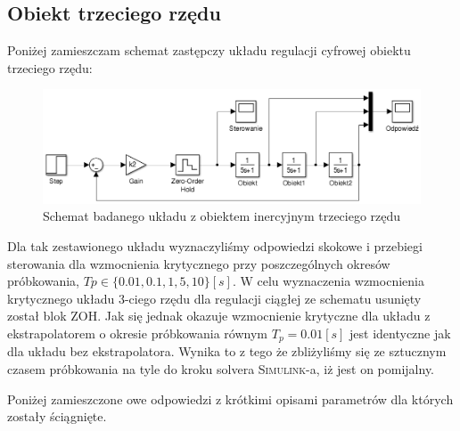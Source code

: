\documentclass[12pt]{article}
\begin{document}
\newpage

\subsection{Obiekt trzeciego rzędu}

Poniżej zamieszczam schemat zastępczy układu regulacji cyfrowej obiektu
trzeciego rzędu:
 
\begin{figure}[!htb]
	\begin{center}
		\includegraphics[width=14cm]{../res/img/schd3.png} 
	\end{center}
	\caption{Schemat badanego układu z obiektem inercyjnym trzeciego rzędu}
\end{figure}

Dla tak zestawionego układu wyznaczyliśmy odpowiedzi skokowe i przebiegi
sterowania dla wzmocnienia krytycznego przy poszczególnych okresów próbkowania,
$Tp\in \{0.01, 0.1, 1, 5, 10\}[s]$. W celu wyznaczenia wzmocnienia krytycznego
układu 3-ciego rzędu dla regulacji ciągłej ze schematu usunięty został blok ZOH.
Jak się jednak okazuje wzmocnienie krytyczne dla układu z ekstrapolatorem o
okresie próbkowania równym $T_p=0.01[s]$ jest identyczne jak dla układu bez
ekstrapolatora. Wynika to z tego że zbliżyliśmy się ze sztucznym czasem
próbkowania na tyle do kroku solvera \textsc{Simulink}-a, iż jest on pomijalny.

Poniżej zamieszczone owe odpowiedzi z krótkimi opisami parametrów dla których
zostały ściągnięte.
 
\newpage
\end{document}
